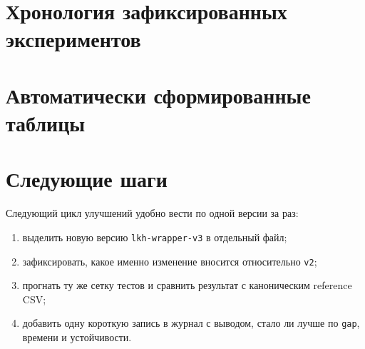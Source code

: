 \documentclass[a4paper,12pt]{article}
\begin{document}
\section{Хронология зафиксированных экспериментов}


\section{Автоматически сформированные таблицы}


\section{Следующие шаги}

Следующий цикл улучшений удобно вести по одной версии за раз:
\begin{enumerate}[label=\arabic*.]
  \item выделить новую версию \texttt{lkh-wrapper-v3} в отдельный файл;
  \item зафиксировать, какое именно изменение вносится относительно \texttt{v2};
  \item прогнать ту же сетку тестов и сравнить результат с каноническим reference CSV;
  \item добавить одну короткую запись в журнал с выводом, стало ли лучше по \texttt{gap}, времени и устойчивости.
\end{enumerate}
\end{document}
